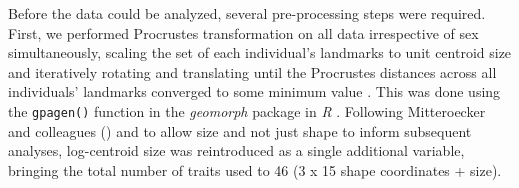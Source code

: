 \documentclass[10pt, twocolumn, twoside]{article}
\begin{document}
Before the data could be analyzed, several pre-processing steps were required. First, we performed Procrustes transformation \citep{gowerGeneralizedProcrustesAnalysis1975, drydenStatisticalShapeAnalysis2016} on all data irrespective of sex simultaneously, scaling the set of each individual's landmarks to unit centroid size and iteratively rotating and translating until the Procrustes distances across all individuals' landmarks converged to some minimum value \citep{booksteinLandmarkMethodsForms1997}. This was done using the \texttt{gpagen()} function in the \textit{geomorph} package \citep{adamsGeometricMorphometricAnalyses2019} in \textit{R} \citep{rcoreteamLanguageEnvironmentStatistical2013}. Following Mitteroecker and colleagues (\citeyear{mitteroeckerComparisonCranialOntogenetic2004}) and to allow size and not just shape to inform subsequent analyses, log-centroid size was reintroduced as a single additional variable, bringing the total number of traits used to 46 (3 x 15 shape coordinates + size). 
\end{document}
